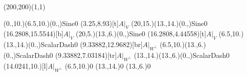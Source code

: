 \unitlength=1bp%

\begin{feynartspicture}(200,200)(1,1)

\FADiagram{}
\FAProp(0.,10.)(6.5,10.)(0.,){Sine}{0}
\FALabel(3.25,8.93)[t]{$A|_V$}
\FAProp(20,15.)(13.,14.)(0.,){Sine}{0}
\FALabel(16.2808,15.5544)[b]{$A|_V$}
\FAProp(20,5.)(13.,6.)(0.,){Sine}{0}
\FALabel(16.2808,4.44558)[t]{$A|_V$}
\FAProp(6.5,10.)(13.,14.)(0.,){ScalarDash}{0}
\FALabel(9.33882,12.9682)[br]{$A|_{W^\perp}$}
\FAProp(6.5,10.)(13.,6.)(0.,){ScalarDash}{0}
\FALabel(9.33882,7.03184)[tr]{$A|_{W^\perp}$}
\FAProp(13.,14.)(13.,6.)(0.,){ScalarDash}{0}
\FALabel(14.0241,10.)[l]{$A|_{W^\perp}$}
\FAVert(6.5,10.){0}
\FAVert(13.,14.){0}
\FAVert(13.,6.){0}
\end{feynartspicture}


